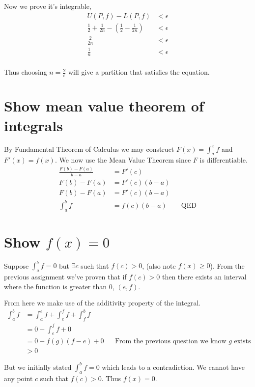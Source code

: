 \documentclass{article}
\begin{document}
Now we prove it's integrable,
\begin{align*}
    U(P,f) - L(P,f) &< \epsilon \\
    \frac{1}{2} + \frac{1}{2n} - \left(\frac{1}{2} - \frac{1}{2n}\right)
    &< \epsilon \\
    \frac{2}{2n} &< \epsilon \\
    \frac{1}{n} &< \epsilon \\
\end{align*}

Thus choosing $n = \frac{2}{\epsilon}$ will give a partition that satisfies
the equation.

\section{Show mean value theorem of integrals}
By Fundamental Theorem of Calculus we may construct $F(x) = \int_a^x f$ and
$F'(x) = f(x)$. We now use the Mean Value Theorem since $F$ is differentiable.
\begin{align*}
    \frac{F(b) - F(a)}{b - a} &= F'(c) \\
    F(b) - F(a) &= F'(c)(b - a) \\
    F(b) - F(a) &= F'(c)(b - a) \\
    \int_a^b f &= f(c)(b - a) && \text{QED}
\end{align*}

\section{Show $f(x) = 0$}
Suppose $\int_a^b f = 0$ but $\exists c$ such that $f(c) > 0$,
(also note $f(x) \geq 0$). From the
previous assignment we've proven that if $f(c) > 0$ then there exists an
interval where the function is greater than 0, $(e, f)$.

From here we make use of the additivity property of the integral.
\begin{align*}
    \int_a^b f &= \int_a^e f + \int_e^f f + \int_f^b f \\
    &= 0 + \int_e^f f + 0 \\
    &= 0 + f(g)(f-e) + 0
    && \text{From the previous question we know $g$ exists} \\
    &> 0
\end{align*}

But we initially stated $\int_a^b f = 0$ which leads to a contradiction. We
cannot have any point $c$ such that $f(c) > 0$. Thus $f(x) = 0$.
\end{document}
